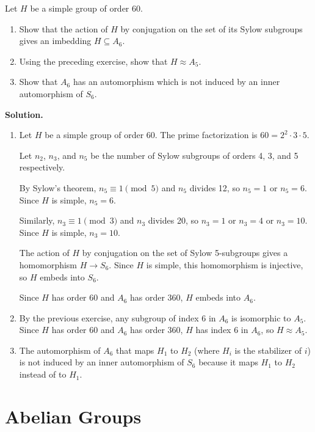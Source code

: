 \begin{problembox}
Let $H$ be a simple group of order 60.
\begin{enumerate}[label=(\alph*)]
\item Show that the action of $H$ by conjugation on the set of its Sylow subgroups gives an imbedding $H \subseteq A_6$.
\item Using the preceding exercise, show that $H \approx A_5$.
\item Show that $A_6$ has an automorphism which is not induced by an inner automorphism of $S_6$.
\end{enumerate}
\end{problembox}

\noindent\textbf{Solution.}
\begin{enumerate}[label=(\alph*)]
\item Let $H$ be a simple group of order 60. The prime factorization is $60 = 2^2 \cdot 3 \cdot 5$.

Let $n_2$, $n_3$, and $n_5$ be the number of Sylow subgroups of orders 4, 3, and 5 respectively.

By Sylow's theorem, $n_5 \equiv 1 \pmod{5}$ and $n_5$ divides 12, so $n_5 = 1$ or $n_5 = 6$. Since $H$ is simple, $n_5 = 6$.

Similarly, $n_3 \equiv 1 \pmod{3}$ and $n_3$ divides 20, so $n_3 = 1$ or $n_3 = 4$ or $n_3 = 10$. Since $H$ is simple, $n_3 = 10$.

The action of $H$ by conjugation on the set of Sylow 5-subgroups gives a homomorphism $H \to S_6$. Since $H$ is simple, this homomorphism is injective, so $H$ embeds into $S_6$.

Since $H$ has order 60 and $A_6$ has order 360, $H$ embeds into $A_6$.

\item By the previous exercise, any subgroup of index 6 in $A_6$ is isomorphic to $A_5$. Since $H$ has order 60 and $A_6$ has order 360, $H$ has index 6 in $A_6$, so $H \approx A_5$.

\item The automorphism of $A_6$ that maps $H_1$ to $H_2$ (where $H_i$ is the stabilizer of $i$) is not induced by an inner automorphism of $S_6$ because it maps $H_1$ to $H_2$ instead of to $H_1$.
\end{enumerate}

\section{Abelian Groups}

